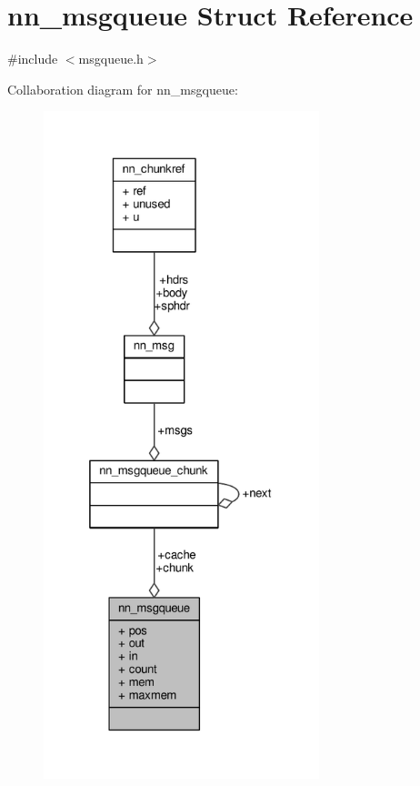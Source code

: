 \hypertarget{structnn__msgqueue}{}\section{nn\+\_\+msgqueue Struct Reference}
\label{structnn__msgqueue}


{\ttfamily \#include $<$msgqueue.\+h$>$}



Collaboration diagram for nn\+\_\+msgqueue\+:\nopagebreak
\begin{figure}[H]
\begin{center}
\leavevmode
\includegraphics[height=550pt]{structnn__msgqueue__coll__graph}
\end{center}
\end{figure}
